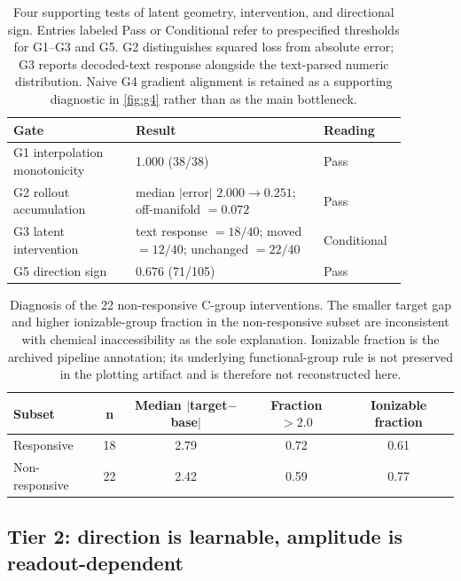 \documentclass[11pt]{article}
\begin{document}
\begin{table}[t]
\centering
\caption{Four supporting tests of latent geometry, intervention, and directional sign. Entries labeled Pass or Conditional refer to prespecified thresholds for G1--G3 and G5. G2 distinguishes squared loss from absolute error; G3 reports decoded-text response alongside the text-parsed numeric distribution. Naive G4 gradient alignment is retained as a supporting diagnostic in \cref{fig:g4} rather than as the main bottleneck.}
\label{tab:gates}
\small
\begin{tabular}{p{0.29\linewidth}p{0.43\linewidth}p{0.16\linewidth}}
\toprule
Gate & Result & Reading \\
\midrule
G1 interpolation monotonicity & 1.000 (38/38) & Pass \\
G2 rollout accumulation & median $\lvert\mathrm{error}\rvert$ $2.000\rightarrow0.251$; off-manifold $=0.072$ & Pass \\
G3 latent intervention & text response $=18/40$; moved $=12/40$; unchanged $=22/40$ & Conditional \\
G5 direction sign & 0.676 (71/105) & Pass \\
\bottomrule
\end{tabular}
\end{table}

\begin{table}[t]
\centering
\caption{Diagnosis of the 22 non-responsive C-group interventions. The smaller target gap and higher ionizable-group fraction in the non-responsive subset are inconsistent with chemical inaccessibility as the sole explanation. Ionizable fraction is the archived pipeline annotation; its underlying functional-group rule is not preserved in the plotting artifact and is therefore not reconstructed here.}
\label{tab:nonresponse}
\small
\begin{tabular}{lcccc}
\toprule
Subset & n & Median $\lvert$target$-$base$\rvert$ & Fraction $>2.0$ & Ionizable fraction \\
\midrule
Responsive & 18 & 2.79 & 0.72 & 0.61 \\
Non-responsive & 22 & 2.42 & 0.59 & 0.77 \\
\bottomrule
\end{tabular}
\end{table}

\subsection{Tier 2: direction is learnable, amplitude is readout-dependent}
\label{sec:direction_amplitude}
\end{document}
